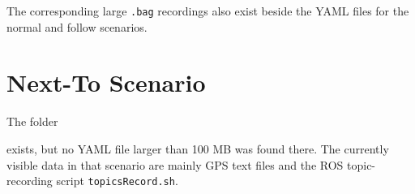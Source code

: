 \documentclass[a4paper]{article}
\begin{document}
      The corresponding large \texttt{.bag} recordings also exist beside the YAML files for the normal and follow scenarios.

   \section{Next-To Scenario}

      The folder

      \texttt{}

      exists, but no YAML file larger than 100 MB was found there. The currently visible data in that scenario are mainly GPS text files and the ROS topic-recording script \texttt{topicsRecord.sh}.
\end{document}
